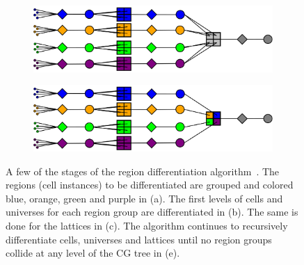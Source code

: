 \begin{figure}[h!]
\begin{subfigure}{\textwidth}
  \centering
  \includegraphics[width=0.75\linewidth]{figures/workflow/opencg/region-differentiation-4}
  \caption{}
  \label{fig:differentation-4}
\end{subfigure}
\begin{subfigure}{\textwidth}
  \centering
  \includegraphics[width=0.75\linewidth]{figures/workflow/opencg/region-differentiation-5}
  \caption{}
  \label{fig:differentation-5}
\end{subfigure}
\caption{A few of the stages of the region differentiation algorithm~\cite{boyd2015opencg}. The regions (cell instances) to be differentiated are grouped and colored blue, orange, green and purple in (a). The first levels of cells and universes for each region group are differentiated in (b). The same is done for the lattices in (c). The algorithm continues to recursively differentiate cells, universes and lattices until no region groups collide at any level of the CG tree in (e).}
\label{fig:region-differentiation}
\end{figure}